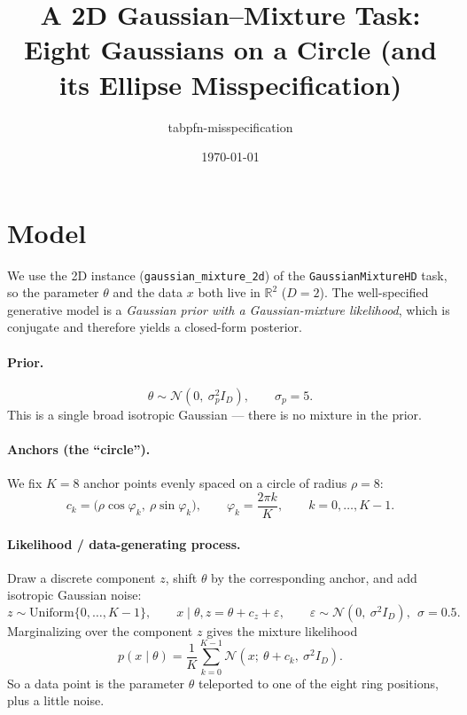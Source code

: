 \documentclass[11pt]{article}
\title{A 2D Gaussian--Mixture Task:\\ Eight Gaussians on a Circle (and its Ellipse Misspecification)}
\author{tabpfn-misspecification}
\date{\today}
\begin{document}
\maketitle

\section{Model}

We use the 2D instance (\texttt{gaussian\_mixture\_2d}) of the
\texttt{GaussianMixtureHD} task, so the parameter $\theta$ and the data $x$ both
live in $\mathbb{R}^{2}$ ($D=2$). The well-specified generative model is a
\emph{Gaussian prior with a Gaussian-mixture likelihood}, which is conjugate and
therefore yields a closed-form posterior.

\paragraph{Prior.}
\begin{equation}
  \theta \sim \mathcal{N}\!\left(0,\ \sigma_p^2 I_D\right), \qquad \sigma_p = 5 .
\end{equation}
This is a single broad isotropic Gaussian --- there is no mixture in the prior.

\paragraph{Anchors (the ``circle'').}
We fix $K=8$ anchor points evenly spaced on a circle of radius $\rho = 8$:
\begin{equation}
  c_k = \big(\rho\cos\varphi_k,\ \rho\sin\varphi_k\big), \qquad
  \varphi_k = \frac{2\pi k}{K}, \qquad k = 0,\dots,K-1 .
\end{equation}

\paragraph{Likelihood / data-generating process.}
Draw a discrete component $z$, shift $\theta$ by the corresponding anchor, and add
isotropic Gaussian noise:
\begin{equation}
  z \sim \mathrm{Uniform}\{0,\dots,K-1\}, \qquad
  x \mid \theta, z = \theta + c_z + \varepsilon, \qquad
  \varepsilon \sim \mathcal{N}\!\left(0,\ \sigma^2 I_D\right),\ \ \sigma = 0.5 .
\end{equation}
Marginalizing over the component $z$ gives the mixture likelihood
\begin{equation}
  p(x \mid \theta)
  = \frac{1}{K}\sum_{k=0}^{K-1}
      \mathcal{N}\!\left(x;\ \theta + c_k,\ \sigma^2 I_D\right) .
  \label{eq:lik}
\end{equation}
So a data point is the parameter $\theta$ teleported to one of the eight ring
positions, plus a little noise.
\end{document}

